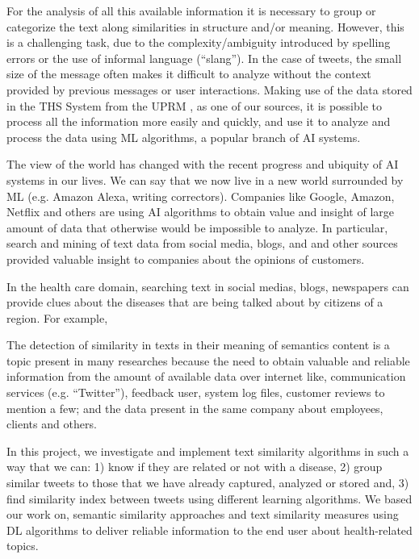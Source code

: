 \documentclass[12pt]{report}
\begin{document}
	For the analysis of all this available information it is necessary to group or categorize the text along similarities in structure and/or meaning. However, this is a challenging task, due to the complexity/ambiguity introduced by  spelling errors or the use of informal language (``slang'').  In the case of tweets, the small size of the message often makes it difficult to analyze without the context provided by previous messages or user interactions. Making use of the data stored in the  \ac{THS} System from the \ac{UPRM} , as one of our sources, it is possible to process all the information more easily and quickly, and use it to analyze and process the data using  \ac{ML} algorithms, a popular branch of \ac{AI} systems.
	
	The view of the world has changed with the recent progress and ubiquity   of \ac{AI} systems in our lives. We can say that we now live in a new world surrounded by \ac{ML} (e.g. Amazon Alexa, writing correctors). Companies like Google, Amazon, Netflix and others are using \ac{AI} algorithms to obtain value and insight of large amount of data that  otherwise would be  impossible to analyze. In particular, search and mining of text data from social media, blogs, and and other sources provided valuable insight to companies about the opinions of customers. 
	
	In the health care domain, searching text in social medias, blogs, newspapers can provide clues about the diseases that are being talked about 
	by citizens of a region. For example, 
	
	The detection of similarity in texts in their meaning of semantics content is a topic present in many researches because the need to obtain valuable and reliable information from the amount of available data over internet like, communication services (e.g. “Twitter”), feedback user, system log files, customer reviews to mention a few; and the data present in the same company about employees, clients and others. 
	
	In this project, we investigate and implement text similarity algorithms in such a way that we can: 1) know if they are related or not with a disease, 2) group similar tweets to those that we have already captured, analyzed or stored and, 3) find similarity index between tweets using different learning algorithms. We based our work on, semantic similarity approaches and text similarity measures using \ac{DL} algorithms to deliver reliable information to the end user about health-related topics.
	
\end{document}

